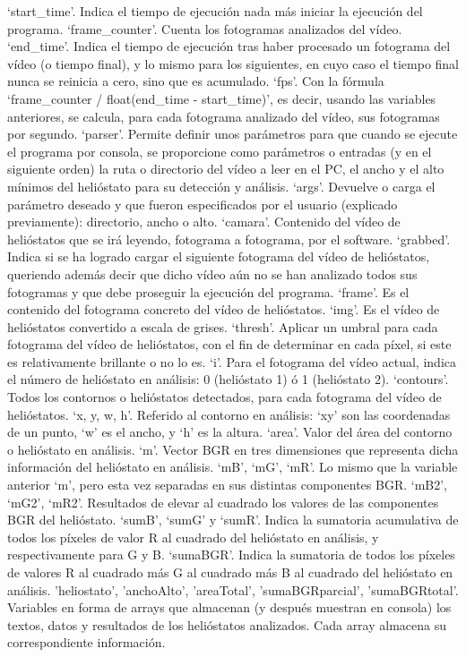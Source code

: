 ‘start\_time’. Indica el tiempo de ejecución nada más iniciar la ejecución del programa.
‘frame\_counter’. Cuenta los fotogramas analizados del vídeo.
‘end\_time’. Indica el tiempo de ejecución tras haber procesado un fotograma del vídeo (o tiempo final), y lo mismo para los siguientes, en cuyo caso el tiempo final nunca se reinicia a cero, sino que es acumulado.
‘fps’. Con la fórmula ‘frame\_counter / float(end\_time - start\_time)’, es decir, usando las variables anteriores, se calcula, para cada fotograma analizado del vídeo, sus fotogramas por segundo.
‘parser’. Permite definir unos parámetros para que cuando se ejecute el programa por consola, se proporcione como parámetros o entradas (y en el siguiente orden) la ruta o directorio del vídeo a leer en el PC, el ancho y el alto mínimos del helióstato para su detección y análisis.
‘args’. Devuelve o carga el parámetro deseado y que fueron especificados por el usuario (explicado previamente): directorio, ancho o alto.
‘camara’. Contenido del vídeo de helióstatos que se irá leyendo, fotograma a fotograma, por el software.
‘grabbed’. Indica si se ha logrado cargar el siguiente fotograma del vídeo de helióstatos, queriendo además decir que dicho vídeo aún no se han analizado todos sus fotogramas y que debe proseguir la ejecución del programa.
‘frame’. Es el contenido del fotograma concreto del vídeo de helióstatos.
‘img’. Es el vídeo de helióstatos convertido a escala de grises.
‘thresh’. Aplicar un umbral para cada fotograma del vídeo de helióstatos, con el fin de determinar en cada píxel, si este es relativamente brillante o no lo es.
‘i’. Para el fotograma del vídeo actual, indica el número de helióstato en análisis: 0 (helióstato 1) ó 1 (helióstato 2).
‘contours’. Todos los contornos o helióstatos detectados, para cada fotograma del vídeo de helióstatos.
‘x, y, w, h’. Referido al contorno en análisis: ‘xy’ son las coordenadas de un punto, ‘w’ es el ancho, y ‘h’ es la altura.
‘area’. Valor del área del contorno o helióstato en análisis.
‘m’. Vector BGR en tres dimensiones que representa dicha información del helióstato en análisis.
‘mB’, ‘mG’, ‘mR’. Lo mismo que la variable anterior ‘m’, pero esta vez separadas en sus distintas componentes BGR.
‘mB2’, ‘mG2’, ‘mR2’. Resultados de elevar al cuadrado los valores de las componentes BGR del helióstato.
‘sumB’, ‘sumG’ y ‘sumR’. Indica la sumatoria acumulativa de todos los píxeles de valor R al cuadrado del helióstato en análisis, y respectivamente para G y B.
‘sumaBGR’. Indica la sumatoria de todos los píxeles de valores R al cuadrado más G al cuadrado más B al cuadrado del helióstato en análisis.
'heliostato', 'anchoAlto', 'areaTotal', 'sumaBGRparcial', 'sumaBGRtotal'. Variables en forma de arrays que almacenan (y después muestran en consola) los textos, datos y resultados de los helióstatos analizados. Cada array almacena su correspondiente información.

